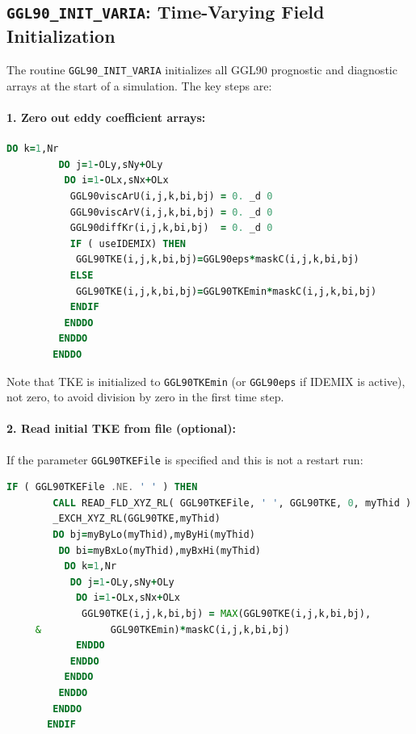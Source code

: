 \documentclass[12pt,letterpaper]{article}
\begin{document}
\subsection{\texttt{GGL90\_INIT\_VARIA}: Time-Varying Field Initialization}
\label{sec:init_varia}

The routine \verb|GGL90_INIT_VARIA| initializes all GGL90 prognostic and diagnostic arrays at the start of a simulation. The key steps are:

\paragraph{1. Zero out eddy coefficient arrays:}
\begin{lstlisting}[language=Fortran,caption={(ggl90\_init\_varia.F:L42--56) Initialize arrays to zero}]
        DO k=1,Nr
         DO j=1-OLy,sNy+OLy
          DO i=1-OLx,sNx+OLx
           GGL90viscArU(i,j,k,bi,bj) = 0. _d 0
           GGL90viscArV(i,j,k,bi,bj) = 0. _d 0
           GGL90diffKr(i,j,k,bi,bj)  = 0. _d 0
           IF ( useIDEMIX) THEN
            GGL90TKE(i,j,k,bi,bj)=GGL90eps*maskC(i,j,k,bi,bj)
           ELSE
            GGL90TKE(i,j,k,bi,bj)=GGL90TKEmin*maskC(i,j,k,bi,bj)
           ENDIF
          ENDDO
         ENDDO
        ENDDO
\end{lstlisting}

Note that TKE is initialized to \verb|GGL90TKEmin| (or \verb|GGL90eps| if IDEMIX is active), not zero, to avoid division by zero in the first time step.

\paragraph{2. Read initial TKE from file (optional):}

If the parameter \verb|GGL90TKEFile| is specified and this is not a restart run:

\begin{lstlisting}[language=Fortran,caption={(ggl90\_init\_varia.F:L135--150) Read initial TKE from file}]
       IF ( GGL90TKEFile .NE. ' ' ) THEN
        CALL READ_FLD_XYZ_RL( GGL90TKEFile, ' ', GGL90TKE, 0, myThid )
        _EXCH_XYZ_RL(GGL90TKE,myThid)
        DO bj=myByLo(myThid),myByHi(myThid)
         DO bi=myBxLo(myThid),myBxHi(myThid)
          DO k=1,Nr
           DO j=1-OLy,sNy+OLy
            DO i=1-OLx,sNx+OLx
             GGL90TKE(i,j,k,bi,bj) = MAX(GGL90TKE(i,j,k,bi,bj),
     &            GGL90TKEmin)*maskC(i,j,k,bi,bj)
            ENDDO
           ENDDO
          ENDDO
         ENDDO
        ENDDO
       ENDIF
\end{lstlisting}
\end{document}

